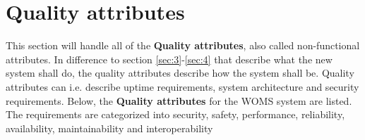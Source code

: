 \section{Quality attributes} 
\label{sec:quality_attributes}

This section will handle all of the \textbf{Quality attributes}, also called non-functional attributes.  In difference to section \ref{sec:3}-\ref{sec:4} that describe what the new system shall do, the quality attributes describe how the system shall be\cite {idi.ntnu}.  Quality attributes can i.e. describe uptime requirements, system architecture and security requirements.
Below, the \textbf{Quality attributes} for the WOMS system are listed. The requirements are categorized into security, safety, performance, reliability, availability, maintainability and interoperability	

